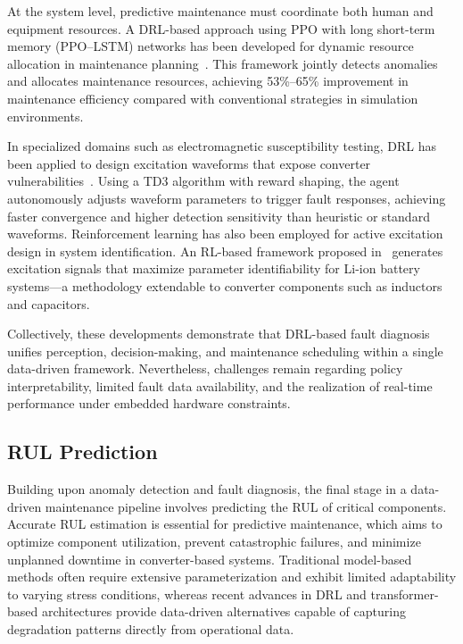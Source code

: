 At the system level, predictive maintenance must coordinate both human and equipment resources. 
A DRL-based approach using PPO with long short-term memory (PPO–LSTM) networks has been developed for dynamic resource allocation in maintenance planning~\cite{ong2021deep}. 
This framework jointly detects anomalies and allocates maintenance resources, achieving 53\%–65\% improvement in maintenance efficiency compared with conventional strategies in simulation environments.

In specialized domains such as electromagnetic susceptibility testing, DRL has been applied to design excitation waveforms that expose converter vulnerabilities~\cite{chen2024determining}. 
Using a TD3 algorithm with reward shaping, the agent autonomously adjusts waveform parameters to trigger fault responses, achieving faster convergence and higher detection sensitivity than heuristic or standard waveforms. 
Reinforcement learning has also been employed for active excitation design in system identification. 
An RL-based framework proposed in~\cite{huang2023reinforcement} generates excitation signals that maximize parameter identifiability for Li-ion battery systems—a methodology extendable to converter components such as inductors and capacitors.

Collectively, these developments demonstrate that DRL-based fault diagnosis unifies perception, decision-making, and maintenance scheduling within a single data-driven framework. 
Nevertheless, challenges remain regarding policy interpretability, limited fault data availability, and the realization of real-time performance under embedded hardware constraints.


\subsection{RUL Prediction}
\label{sec:rul_prediction}

Building upon anomaly detection and fault diagnosis, the final stage in a data-driven maintenance pipeline involves predicting the RUL of critical components. 
Accurate RUL estimation is essential for predictive maintenance, which aims to optimize component utilization, prevent catastrophic failures, and minimize unplanned downtime in converter-based systems. 
Traditional model-based methods often require extensive parameterization and exhibit limited adaptability to varying stress conditions, whereas recent advances in DRL and transformer-based architectures provide data-driven alternatives capable of capturing degradation patterns directly from operational data.

